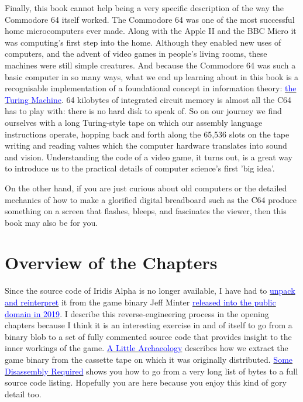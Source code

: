 Finally, this book cannot help being a very specific description of the way
the Commodore 64 itself worked. The Commodore 64 was one of the most successful
home microcomputers ever made. Along with the Apple II and the BBC Micro it was
computing's first step into the home. Although they enabled new uses of computers,
and the advent of video games in people's living rooms, these machines were still
simple creatures. And because the Commodore 64 was such a basic computer
in so many ways, what we end up learning about in this book is a recognisable implementation
of a foundational concept in information theory:
\href{https://en.wikipedia.org/wiki/Turing_machine}{\textcolor{blue}{the Turing Machine}}.
64 kilobytes of integrated circuit memory is almost all the C64 has to play with: there is no hard 
disk to speak of. So on our journey we find ourselves with a long Turing-style tape on which
our assembly language instructions operate, hopping back and forth along the 
65,536 slots on the tape writing and reading values which the computer hardware
translates into sound and vision. Understanding the code of a video game, it
turns out, is a great way to introduce us to the practical details of
computer science's first 'big idea'.

On the other hand, if you are just curious about old computers or the detailed mechanics of how to make a
glorified digital breadboard such as the C64 produce something on a screen that
flashes, bleeps, and fascinates the viewer, then this book may also be for you. 

\section*{Overview of the Chapters}
Since the source code of Iridis Alpha is no longer available, I have had to
\href{https://github.com/mwenge/iridisalpha}{\textcolor{blue}{unpack and
reinterpret}} it from the game binary Jeff Minter
\href{https://www.llamasoftarchive.org/oldsite/llamasoft/cbm64/IridisAlpha.zip}{\textcolor{blue}{released
into the public domain in 2019}}. I describe this reverse-engineering process
in the opening chapters because I think it is an interesting exercise in and of
itself to go from a binary blob to a set of fully commented source code that
provides insight to the inner workings of the game.
\hyperref[sec:archaeo]{\textcolor{blue}{A Little Archaeology}} describes how we
extract the game binary from the cassette tape on which it was originally
distributed. \hyperref[sec:disassembly]{\textcolor{blue}{Some Disassembly
Required}} shows you how to go from a very long list of bytes to a full source
code listing. Hopefully you are here because you enjoy this kind of gory detail
too.

